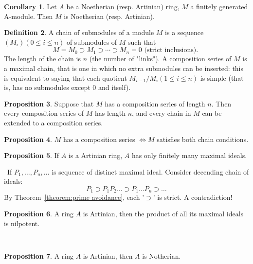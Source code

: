 \documentclass[a4paper,12pt]{article}
\newenvironment{prooff}{{\noindent\it\textcolor{cyan!40!black}{Proof}:}\,}{\par}
\theoremstyle{definition}
\newtheorem{defn}{Definition}[subsection]
\newtheorem{coro}[defn]{Corollary}
\newtheorem{prop}[defn]{Proposition}
\begin{document}
\begin{coro}
    Let $A$ be a Noetherian (resp. Artinian) ring, $M$ a finitely generated A-module. Then $M$ is Noetherian (resp. Artinian).
\end{coro}
\begin{defn}
    A chain of submodules of a module $M$ is a sequence $\left(M_i\right)(0 \leqslant i \leqslant n)$ of submodules of $M$ such that
    $$
        M=M_0 \supset M_1 \supset \cdots \supset M_n=0 \text { (strict inclusions). }
    $$
    The length of the chain is $n$ (the number of "links"). A composition series of $M$ is a maximal chain, that is one in which no extra submodules can be inserted: this is equivalent to saying that each quotient $M_{i-1} / M_i(1 \leqslant i \leqslant n)$ is simple (that is, has no submodules except 0 and itself).
\end{defn}
\begin{prop}
    Suppose that $M$ has a composition series of length $n$. Then every composition series of $M$ has length $n$, and every chain in $M$ can be extended to a composition series.
\end{prop}
\begin{prop}
    $M$ has a composition series $\Leftrightarrow M$ satisfies both chain conditions.
\end{prop}

\begin{prop}
    If $A$ is a Artinian ring, $A$ has only finitely many maximal ideals.
\end{prop}
\begin{prooff}
    If $P_1,\dots,P_n,\dots $ is sequence of distinct maximal ideal. Consider decending chain of ideals:
    \begin{equation*}
        P_1\supset P_1P_2\dots \supset P_1\dots P_n\supset \dots
    \end{equation*}
    By Theorem~\ref{theorem:prime avoidance}, each '$\supset$' is strict. A contradiction!
\end{prooff}
\begin{prop}
    A ring $A$ is Artinian, then the product of all its maximal ideals is nilpotent.
\end{prop}
\begin{prooff}

\end{prooff}
\begin{prop}
    A ring $A$ is Artinian, then $A$ is Notherian.
\end{prop}
\end{document}
